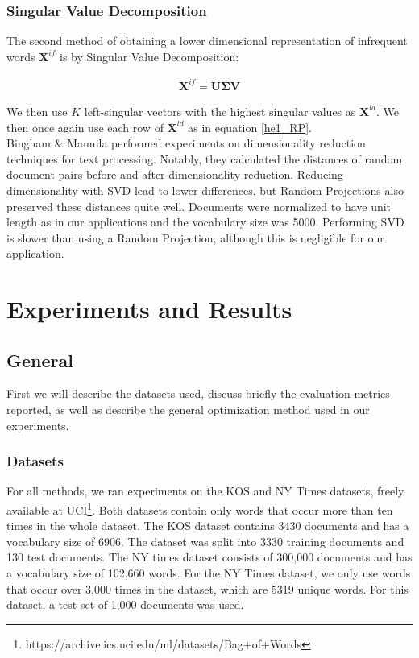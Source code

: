 \documentclass{report}
\begin{document}
\subsection{Singular Value Decomposition}\label{SVD}
The second method of obtaining a lower dimensional representation of infrequent words $\mathbf{X}^{if}$ is by Singular Value Decomposition:

\begin{align}
\mathbf{X}^{if} = \mathbf{U\Sigma V}
\end{align}

We then use $K$ left-singular vectors with the highest singular values as $\mathbf{X}^{ld}$. We then once again use each row of $\mathbf{X}^{ld}$ as in equation \ref{he1_RP}.\\
 Bingham \& Mannila \cite{bingham2001random} performed experiments on dimensionality reduction techniques for text processing. Notably, they calculated the distances of random document pairs before and after dimensionality reduction. Reducing dimensionality with SVD lead to lower differences, but Random Projections also preserved these distances quite well. Documents were normalized to have unit length as in our applications and the vocabulary size was 5000. Performing SVD is slower than using a Random Projection, although this is negligible for our application. 


\chapter{Experiments and Results}\label{experiments}
\section{General}
First we will describe the datasets used, discuss briefly the evaluation metrics reported, as well as describe the general optimization method used in our experiments. 
	\subsection{Datasets}\label{datasets}
	For all methods, we ran experiments on the KOS and NY Times datasets, freely available at UCI\footnote{https://archive.ics.uci.edu/ml/datasets/Bag+of+Words}. Both datasets contain only words that occur more than ten times in the whole dataset. The KOS dataset contains 3430 documents and has a vocabulary size of 6906. The dataset was split into 3330 training documents and 130 test documents. The NY times dataset consists of 300,000 documents and has a vocabulary size of 102,660 words. For the NY Times dataset, we only use words that occur over 3,000 times in the dataset, which are 5319 unique words.  For this dataset, a test set of 1,000 documents was used.
\end{document}
